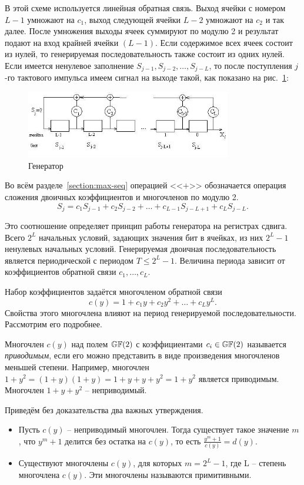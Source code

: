 В этой схеме используется линейная обратная связь. Выход ячейки с номером $L-1$ умножают на $c_{1}$, выход следующей ячейки $L-2$ умножают на $c_2$ и так далее. После умножения выходы ячеек суммируют по модулю 2 и результат подают на вход крайней ячейки $(L-1)$. Если содержимое всех ячеек состоит из нулей, то генерируемая последовательность также состоит из одних нулей. Если имеется ненулевое заполнение $S_{j-1}, S_{j-2}, \dots, S_{j-L}$, то после поступления $j$-го тактового импульса имеем сигнал на выходе такой, как показано на рис.~\ref{fig:generator}:
\begin{figure}[!ht]
	\centering
	\includegraphics[width=0.8\textwidth]{pic/generator}
    \caption{Генератор\label{fig:generator}}
\end{figure}

Во всём разделе~\ref{section:max-seq} операцией <<$+$>> обозначается операция сложения двоичных коэффициентов и многочленов по модулю 2.
\[
    S_{j} = c_{1} S_{j-1} + c_{2} S_{j-2} +  \dots  + c_{L-1} S_{j-L+1} + c_{L} S_{j-L}.
\]

Это соотношение определяет принцип работы генератора на регистрах сдвига. Всего $2^{L}$ начальных условий, задающих значения бит в ячейках, из них $2^{L}-1$ ненулевых начальных условий. Генерируемая двоичная последовательность является периодической с периодом $T\leq 2^{L}-1$. Величина периода зависит от коэффициентов обратной связи $c_{1}, \ldots, c_{L} $.

Набор коэффициентов задаётся многочленом обратной связи
    \[ c(y) = 1 + c_1 y+ c_2 y^2 + \dots + c_L y^L. \]
Свойства этого многочлена влияют на период генерируемой последовательности. Рассмотрим его подробнее.

Многочлен $c(y)$ над полем $\mathbb{GF}(2)$ с коэффициентами $c_i \in \mathbb{GF}(2)$ называется \textit{приводимым}, если его можно представить в виде произведения многочленов меньшей степени. Например, многочлен $1 + y^{2} = (1 + y) (1 + y) = 1 + y + y + y^2 = 1 + y^2$ является приводимым. Многочлен $1 + y + y^{2}$ -- неприводимый.

Приведём без доказательства два важных утверждения.
\begin{itemize}
    \item Пусть $c(y)$ -- неприводимый многочлен. Тогда существует такое значение $m$, что $y^{m} + 1$ делится без остатка на $c(y)$, то есть $\frac{y^{m} + 1}{c(y)} = d(y)$.
    \item Существуют многочлены $c(y)$, для которых $m=2^{L} - 1$, где L -- степень многочлена $c(y)$. Эти многочлены называются примитивными.
\end{itemize}

